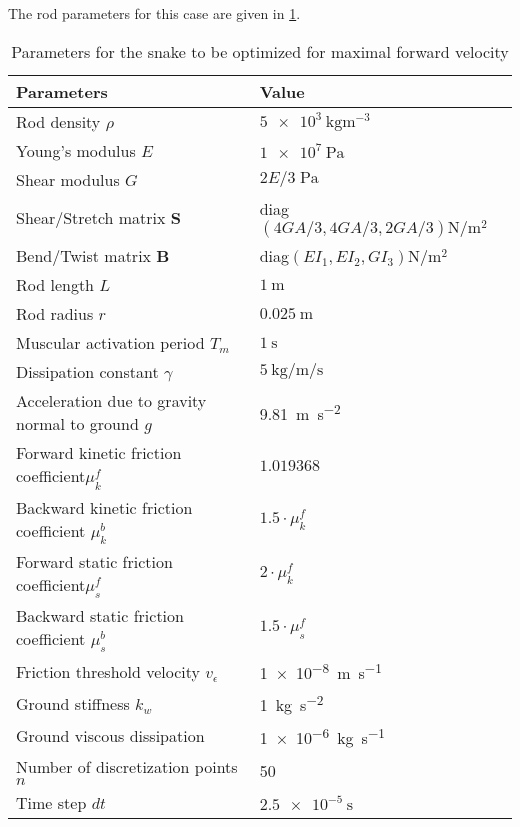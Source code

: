 \documentclass[11pt]{article}
\begin{document}
The rod parameters for this case are given in \cref{tab_opt_snake_params}.

\begin{table}[htbp]
\caption{\label{tab_opt_snake_params}
Parameters for the snake to be optimized for maximal forward velocity}
\centering
\begin{tabular}{ll}
\toprule
Parameters & Value\\
\midrule
Rod density \(\rho\) & \(\SI{5e3}{\kg \m^{-3}}\)\\
Young's modulus \(E\) & \(\SI{1e7}{\Pa}\)\\
Shear modulus \(G\) & \(2E/3\;\si{\Pa}\)\\
Shear/Stretch matrix \(\mathbf{S}\) & diag\((4GA/3, 4GA/3, 2GA/3) \si{\N\per\m^2}\)\\
Bend/Twist matrix \(\mathbf{B}\) & diag\((EI_1, EI_2, GI_3) \si{\N\per\m^2}\)\\
Rod length \(L\) & \(\SI{1}{\m}\)\\
Rod radius \(r\) & \(\SI{0.025}{\m}\)\\
Muscular activation period \(T_m\) & \(\SI{1}{\second}\)\\
Dissipation constant \(\gamma\) & \(\SI{5}{\kg\per\m\per\second}\)\\
Acceleration due to gravity normal to ground \(g\) & \SI{9.81}{\m \per \s^2}\\
Forward kinetic friction coefficient\(\mu^f_k\) & \(1.019368\)\\
Backward kinetic friction coefficient \(\mu^b_k\) & \(1.5 \cdot  \mu^f_k\)\\
Forward static friction coefficient\(\mu^f_s\) & \(2 \cdot  \mu^f_k\)\\
Backward static friction coefficient \(\mu^b_s\) & \(1.5 \cdot  \mu^f_s\)\\
Friction threshold velocity \(v_{\epsilon}\) & \SI{1e-8}{\m\per\s}\\
Ground stiffness \(k_w\) & \SI{1}{\kg \per \s^2}\\
Ground viscous dissipation & \SI{1e-6}{\kg \per \s}\\
Number of discretization points \(n\) & 50\\
Time step \(dt\) & \(\SI{2.5e-5}{\second}\)\\
\bottomrule
\end{tabular}
\end{table}
\end{document}
